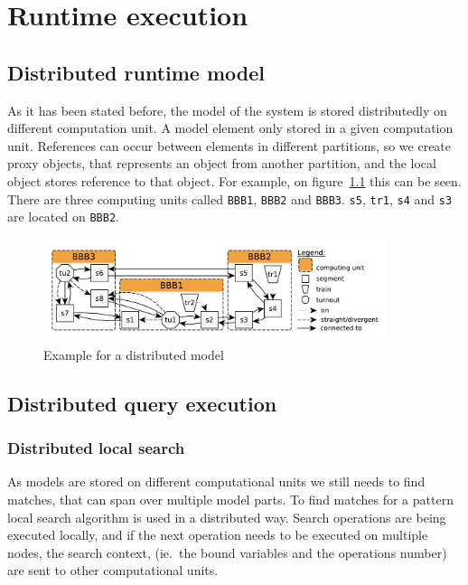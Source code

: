 %
\chapter{Runtime execution}
%


\section{Distributed runtime model}

As it has been stated before, the model of the system is stored distributedly on different computation unit. A model element only stored in a given computation unit. References can occur between elements in different partitions, so we create proxy objects, that represents an object from another partition, and the local object stores reference to that object. For example, on figure~\ref{fig:distrib-model-example} this can be seen. There are three computing units called \texttt{BBB1}, \texttt{BBB2} and \texttt{BBB3}. \texttt{s5}, \texttt{tr1}, \texttt{s4} and \texttt{s3} are located on \texttt{BBB2}. 

\begin{figure}[h]
	\begin{center}
		\includegraphics[width=0.9\textwidth]{figures/runtime-snapshot.pdf}
		\caption{Example for a distributed model}
		\label{fig:distrib-model-example}
	\end{center}
\end{figure}




\section{Distributed query execution}


\subsection{Distributed local search}

As models are stored on different computational units we still needs to find matches, that can span over multiple model parts. To find matches for a pattern local search algorithm is used in a distributed way. Search operations are being executed locally, and if the next operation needs to be executed on multiple nodes, the search context, (ie.\ the bound variables and the operations number) are sent to other computational units.

